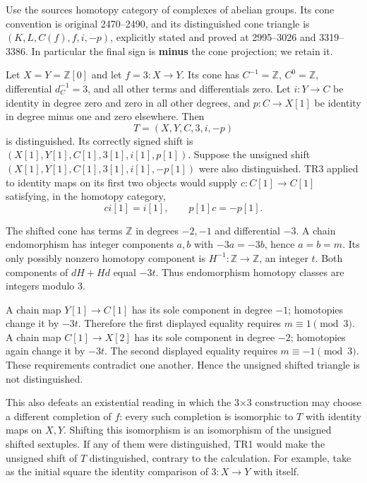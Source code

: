 \documentclass[11pt]{article}
\begin{document}
Use the source\textquotesingle s homotopy category of complexes of abelian groups. Its cone convention is original 2470–\allowbreak{}2490,\allowbreak{} and its distinguished cone triangle is \((K,L,C(f),f,i,-p)\),\allowbreak{} explicitly stated and proved at 2995–\allowbreak{}3026 and 3319–\allowbreak{}3386. In particular the final sign is \textbf{minus} the cone projection; we retain it.

Let \(X=Y=\mathbb Z[0]\) and let \(f=3:X\to Y\). Its cone has \(C^{-1}=\mathbb Z\),\allowbreak{} \(C^0=\mathbb Z\),\allowbreak{} differential \(d_C^{-1}=3\),\allowbreak{} and all other terms and differentials zero. Let \(i:Y\to C\) be identity in degree zero and zero in all other degrees,\allowbreak{} and \(p:C\to X[1]\) be identity in degree minus one and zero elsewhere. Then \[
T=(X,Y,C,3,i,-p)
\] is distinguished. Its correctly signed shift is \((X[1],Y[1],C[1],3[1],i[1],p[1])\). Suppose the unsigned shift \((X[1],Y[1],C[1],3[1],i[1],-p[1])\) were also distinguished. TR3 applied to identity maps on its first two objects would supply \(c:C[1]\to C[1]\) satisfying,\allowbreak{} in the homotopy category,\allowbreak{} \[
ci[1]=i[1],\qquad p[1]c=-p[1].
\]

The shifted cone has terms \(\mathbb Z\) in degrees \(-2,-1\) and differential \(-3\). A chain endomorphism has integer components \(a,b\) with \(-3a=-3b\),\allowbreak{} hence \(a=b=m\). Its only possibly nonzero homotopy component is \(H^{-1}:\mathbb Z\to\mathbb Z\),\allowbreak{} an integer \(t\). Both components of \(dH+Hd\) equal \(-3t\). Thus endomorphism homotopy classes are integers modulo 3.

A chain map \(Y[1]\to C[1]\) has its sole component in degree \(-1\); homotopies change it by \(-3t\). Therefore the first displayed equality requires \(m\equiv1\pmod3\). A chain map \(C[1]\to X[2]\) has its sole component in degree \(-2\); homotopies again change it by \(-3t\). The second displayed equality requires \(m\equiv-1\pmod3\). These requirements contradict one another. Hence the unsigned shifted triangle is not distinguished.

This also defeats an existential reading in which the 3×3 construction may choose a different completion of \(f\):\allowbreak{} every such completion is isomorphic to \(T\) with identity maps on \(X,Y\). Shifting this isomorphism is an isomorphism of the unsigned shifted sextuples. If any of them were distinguished,\allowbreak{} TR1 would make the unsigned shift of \(T\) distinguished,\allowbreak{} contrary to the calculation. For example,\allowbreak{} take as the initial square the identity comparison of \(3:X\to Y\) with itself.
\end{document}
